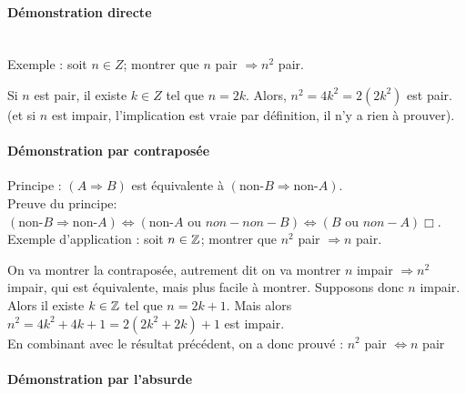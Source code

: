 {\paragraph{Démonstration directe}$ $\\
\\
Exemple : soit $n \in Z$; montrer que \og $n$ pair $\Rightarrow n^2$ pair\fg.\\
\begin{red} Si $n$ est pair, il existe $k \in Z$ tel que $n = 2k$. Alors, $n^2 = 4k^2 = 2(2k^2)$ est pair. (et si $n$ est impair, l'implication est vraie par définition, il n'y a rien à prouver).\end{red}

\paragraph{Démonstration par contraposée}

Principe : $(A\Rightarrow B)$ est équivalente à $(\text{non-}B \Rightarrow \text{non-}A)$.\\
Preuve du principe: $(\text{non-}B \Rightarrow \text{non-}A)\Leftrightarrow (\text{non-}A \text{ ou } non-non-B)\Leftrightarrow (B\text{ ou }non-A)\Box$.\\
Exemple d'application : soit $n\in \mathbb{Z}$; montrer que $n^2$ pair $\Rightarrow n$ pair.
\begin{red}
On va montrer la contraposée, autrement dit on va montrer 
\og $n$ impair $\Rightarrow n^2$ impair\fg, qui est équivalente, mais plus facile à montrer. Supposons donc $n$ impair. Alors il existe $k \in\mathbb{Z}$ tel que $n = 2k+1$. Mais alors $n^2 = 4k^2+4k+1 = 2(2k^2+2k)+1$ est impair.\\
En combinant avec le résultat précédent, on a donc prouvé : \og$n^2$ pair $\Leftrightarrow n$ pair\fg
\end{red}

\paragraph{Démonstration par l'absurde}

}
